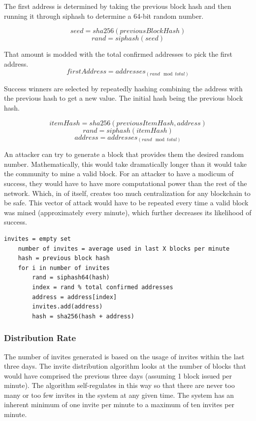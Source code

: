 \documentclass{article}
\begin{document}
The first address is determined by taking the previous block hash and then running
it through siphash \cite{siphash} to determine a 64-bit random number.

    $$seed = sha256(previousBlockHash)$$
    $$rand = siphash(seed)$$

That amount is modded with the total confirmed addresses to pick the first address.
    $$firstAddress = addresses_{(rand \mod total)}$$

Success winners are selected by repeatedly hashing combining the address with the
previous hash to get a new value. The initial hash being the previous block hash.

    $$itemHash = sha256(previousItemHash, address)$$
    $$rand = siphash(itemHash)$$
    $$address = addresses_{(rand \mod total)}$$

An attacker can try to generate a block that provides them the desired
random number. Mathematically, this would take dramatically longer than it would 
take the community to mine a valid block.  For an attacker to have a modicum of success, 
they would have to have more computational power than the rest of the network.  Which, 
in of itself, creates too much centralization for any blockchain to be safe.  
This vector of attack would have to be repeated every time a valid block was mined (approximately every minute),
which further decreases its likelihood of success.

\lstset{language=C}
\begin{lstlisting}[caption=Decentralized Invite Algorithm]
    invites = empty set
    number of invites = average used in last X blocks per minute
    hash = previous block hash
    for i in number of invites
        rand = siphash64(hash)
        index = rand % total confirmed addresses
        address = address[index]
        invites.add(address)
        hash = sha256(hash + address)

\end{lstlisting}

\subsubsection{Distribution Rate}

The number of invites generated is based on the usage of invites within the last three days.  
The invite distribution algorithm looks at the number of blocks that would have comprised the previous three days
(assuming 1 block issued per minute). The algorithm self-regulates in this way so that 
there are never too many or too few invites in the system at any given time.  The system 
has an inherent minimum of one invite per minute to a maximum of ten invites per minute.
\end{document}
